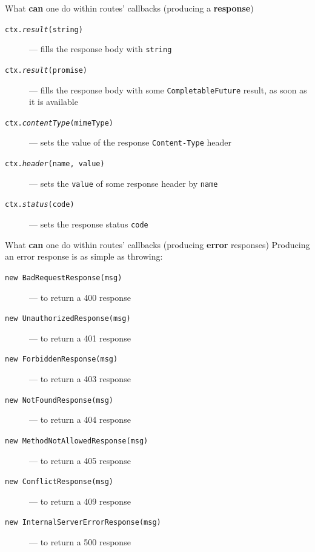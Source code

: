\documentclass[presentation]{beamer}\mode<presentation>{\usetheme{AMSBolognaFC}}
\begin{document}
\begin{frame}[allowframebreaks]
    \begin{block}{What \textbf{can} one do within routes' callbacks (producing a \textbf{response})}
        \begin{description}
            \item[\texttt{ctx.\textit{result}(string)}] --- fills the response body with \texttt{string}
            \item[\texttt{ctx.\textit{result}(promise)}] --- fills the response body with some \texttt{CompletableFuture} result, as soon as it is available
            \item[\texttt{ctx.\textit{contentType}(mimeType)}] --- sets the value of the response \texttt{Content-Type} header
            \item[\texttt{ctx.\textit{header}(name, value)}] --- sets the \texttt{value} of some response header by \texttt{name}
            \item[\texttt{ctx.\textit{status}(code)}] --- sets the response status \texttt{code}
        \end{description}
    \end{block}

    \framebreak

    \begin{block}{What \textbf{can} one do within routes' callbacks (producing \textbf{error} responses)}
        Producing an error response is as simple as \alert{throwing}:
        \begin{description}
            \item[\texttt{new BadRequestResponse(msg)}] --- to return a 400 response
            \item[\texttt{new UnauthorizedResponse(msg)}] --- to return a 401 response
            \item[\texttt{new ForbiddenResponse(msg)}] --- to return a 403 response
            \item[\texttt{new NotFoundResponse(msg)}] --- to return a 404 response
            \item[\texttt{new MethodNotAllowedResponse(msg)}] --- to return a 405 response
            \item[\texttt{new ConflictResponse(msg)}] --- to return a 409 response
            \item[\texttt{new InternalServerErrorResponse(msg)}] --- to return a 500 response
        \end{description}
    \end{block}

    \framebreak


\end{frame}
\end{document}
